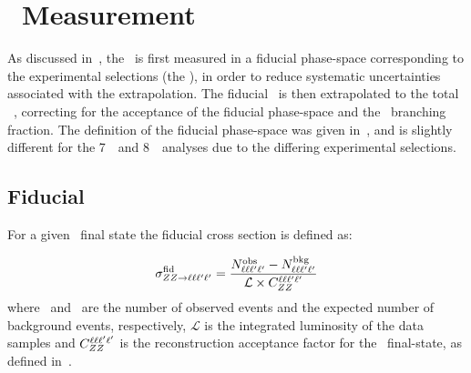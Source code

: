
\section{\CX\ Measurement}

As discussed in~, the \cx\ is first measured in a fiducial phase-space
corresponding to the experimental selections (the ), in
order to reduce systematic uncertainties associated with the extrapolation. The
fiducial \cx\ is then extrapolated to the total \ZZ\ \cx, correcting for the
acceptance of the fiducial phase-space and the \ZZllll\ branching fraction.  The definition of the
fiducial phase-space was given in~, and is slightly different for the
7~\tev\ and 8~\tev\ analyses due to the differing experimental selections.

\subsection{Fiducial \CX}

For a given \ZZllll\ final state the fiducial cross section is defined as:

\begin{equation}\label{eq:xsecfid_fourl}
\sigma_{ZZ\rightarrow\ell\ell\ell'\ell'}^{\rm fid} = \frac{N^{\rm obs}_{\ell\ell\ell'\ell'} - N^{\rm bkg}_{\ell\ell\ell'\ell'}}{\mathcal{L} \times C_{ZZ}^{\ell\ell\ell'\ell'}}
\end{equation}
where \NObs\ and \NBg\ are the number of observed events and the expected number
of background events, respectively, $\mathcal{L}$ is the integrated luminosity
of the data samples and
$C_{ZZ}^{\ell\ell\ell'\ell'}$ is the reconstruction acceptance factor for the \lllplp\
final-state, as defined in~.

